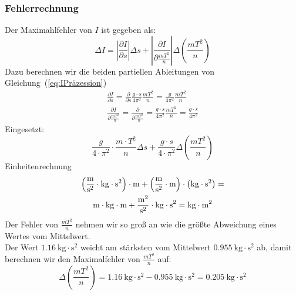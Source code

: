 \documentclass{article}
\begin{document}
	\subsubsection{Fehlerrechnung}
	Der Maximahlfehler von \( I \) ist gegeben als:
	\begin{equation}
		\Delta I = \left| \frac{\partial I}{\partial s} \right| \Delta s
		+ \left| \frac{\partial I}{\partial \frac{mT^2}{n}} \right| \Delta \left( \frac{mT^2}{n} \right)
	\end{equation}
	Dazu berechnen wir die beiden partiellen Ableitungen von Gleichung~(\ref{eq:IPräzession})
	\begin{equation}
		\begin{gathered}
			\frac{\partial I}{\partial s}  = \frac{\partial}{\partial s} \frac{g \cdot s}{ 4 \pi^2 } \frac{ m T^2 }{ n } = \frac{g}{ 4 \pi^2 } \frac{ m T^2 }{ n } \\
			\frac{\partial I}{\partial \frac{mT^2}{n}} = \frac{\partial}{\partial \frac{mT^2}{n}} = \frac{g \cdot s}{ 4 \pi^2 } \frac{ m T^2 }{ n } = \frac{g \cdot s}{ 4 \pi^2 }
		\end{gathered}
	\end{equation}
	Eingesetzt:
	\begin{equation}
		\frac{g}{4 \cdot \pi^2} \cdot \frac{m \cdot T^2 }{n} \Delta s + \frac{ g \cdot s }{4 \cdot \pi^2} \Delta \left( \frac{ m T^2 }{n} \right)
	\end{equation}
	Einheitenrechnung
	\begin{equation}
		\begin{gathered}
			\left( \unit{\frac{\metre}{\second^2}} \cdot \unit{\kilogram} \cdot \unit{\second^2} \right) \cdot \unit{\metre} +
			\left( \unit{\frac{\metre}{\second^2}} \cdot \unit{\metre} \right) \cdot \left( \unit{\kilogram} \cdot \unit{\second^2} \right) = \\
			\unit{\metre \cdot \kilogram} \cdot \unit{\metre} + \unit{\frac{\metre^2}{\second^2}} \cdot \unit{\kilogram \cdot \second^2} = \unit{\kilogram \cdot \metre^2}
		\end{gathered}
	\end{equation}
	Der Fehler von \( \frac{ m T^2 }{n} \) nehmen wir so groß an wie die größte Abweichung eines Wertes vom Mittelwert. \\
	Der Wert \( \SI{1,16}{\kilogram \cdot \second^2}\) weicht am stärksten vom Mittelwert \( \SI{0,955}{\kilogram \cdot \second^2} \) ab, damit berechnen wir den Maximalfehler von \( \frac{ m T^2 }{ n } \) auf:
	\begin{equation}
		\Delta \left( \frac{mT^2}{n} \right) = \SI{1,16}{\kilogram \cdot \second^2} - \SI{0,955}{\kilogram \cdot \second^2} = \SI{0,205}{\kilogram \cdot \second^2}
	\end{equation}
\end{document}
